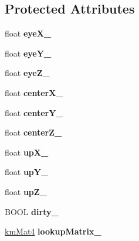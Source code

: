 \subsection*{Protected Attributes}
\begin{DoxyCompactItemize}
\item 
\hypertarget{interface_c_c_camera_a506067ad31f5e42051bcbd5aa41677bd}{float {\bfseries eye\-X\-\_\-}}\label{interface_c_c_camera_a506067ad31f5e42051bcbd5aa41677bd}

\item 
\hypertarget{interface_c_c_camera_a92fc96343efc2f9d1472672e1961d5e6}{float {\bfseries eye\-Y\-\_\-}}\label{interface_c_c_camera_a92fc96343efc2f9d1472672e1961d5e6}

\item 
\hypertarget{interface_c_c_camera_ae9479a1d2bbfa002ad0cc23cbd555f62}{float {\bfseries eye\-Z\-\_\-}}\label{interface_c_c_camera_ae9479a1d2bbfa002ad0cc23cbd555f62}

\item 
\hypertarget{interface_c_c_camera_a1c7ebb287bf6ff04af12bf1779530394}{float {\bfseries center\-X\-\_\-}}\label{interface_c_c_camera_a1c7ebb287bf6ff04af12bf1779530394}

\item 
\hypertarget{interface_c_c_camera_a0055d264b3ba6b8d5eb145686af8dbe7}{float {\bfseries center\-Y\-\_\-}}\label{interface_c_c_camera_a0055d264b3ba6b8d5eb145686af8dbe7}

\item 
\hypertarget{interface_c_c_camera_acf7255c4b9f82298dbc5a4df807a1363}{float {\bfseries center\-Z\-\_\-}}\label{interface_c_c_camera_acf7255c4b9f82298dbc5a4df807a1363}

\item 
\hypertarget{interface_c_c_camera_a7fa497ccbe417febbff9158564c977af}{float {\bfseries up\-X\-\_\-}}\label{interface_c_c_camera_a7fa497ccbe417febbff9158564c977af}

\item 
\hypertarget{interface_c_c_camera_a011e603c9f1b6eddcbf68957a6b08334}{float {\bfseries up\-Y\-\_\-}}\label{interface_c_c_camera_a011e603c9f1b6eddcbf68957a6b08334}

\item 
\hypertarget{interface_c_c_camera_a705369eff4e2aa6f5cc94ff39d122df9}{float {\bfseries up\-Z\-\_\-}}\label{interface_c_c_camera_a705369eff4e2aa6f5cc94ff39d122df9}

\item 
\hypertarget{interface_c_c_camera_af68279c64517937133c23bdb744d9ae0}{B\-O\-O\-L {\bfseries dirty\-\_\-}}\label{interface_c_c_camera_af68279c64517937133c23bdb744d9ae0}

\item 
\hypertarget{interface_c_c_camera_afeccb845e121d300e0e3822223025c7e}{\hyperlink{structkm_mat4}{km\-Mat4} {\bfseries lookup\-Matrix\-\_\-}}\label{interface_c_c_camera_afeccb845e121d300e0e3822223025c7e}

\end{DoxyCompactItemize}

